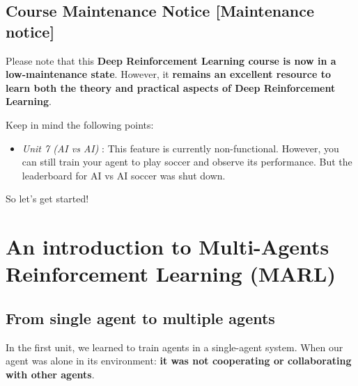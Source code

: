 \documentclass[11pt,a4paper]{article}
\begin{document}
\subsection{Course Maintenance Notice {[}Maintenance notice{]}}\label{course-maintenance-notice-maintenance-notice}

Please note that this \textbf{Deep Reinforcement Learning course is now in a low-maintenance state}. However, it \textbf{remains an excellent resource to learn both the theory and practical aspects of Deep Reinforcement Learning}.

Keep in mind the following points:

\begin{itemize}
\tightlist
\item
  \emph{Unit 7 (AI vs AI)} : This feature is currently non-functional. However, you can still train your agent to play soccer and observe its performance. But the leaderboard for AI vs AI soccer was shut down.
\end{itemize}


So let's get started!

\section[An introduction to Multi-Agents Reinforcement Learning (MARL)]{An introduction to Multi-Agents\texorpdfstring{\\}{ }Reinforcement Learning (MARL)}\label{an-introduction-to-multi-agents-reinforcement-learning-marl}

\subsection{From single agent to multiple agents}\label{from-single-agent-to-multiple-agents}

In the first unit, we learned to train agents in a single-agent system. When our agent was alone in its environment: \textbf{it was not cooperating or collaborating with other agents}.

\end{document}
